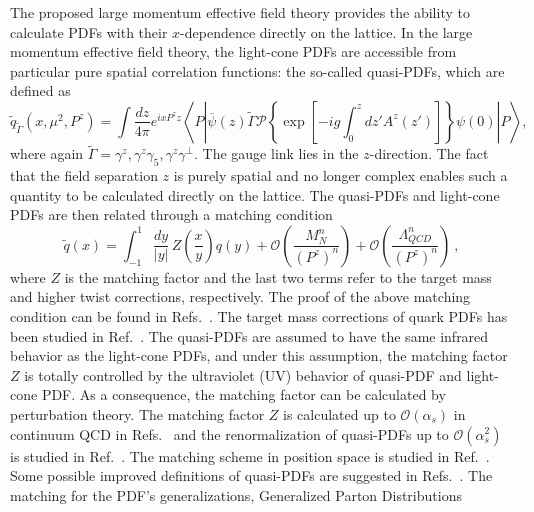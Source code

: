 \documentclass[english,preprint,aps,prd,showpacs,superscriptaddress,nofootinbib,tightenlines]{revtex4}
\begin{document}
The proposed large momentum effective field theory provides the ability
to calculate PDFs with their $x$-dependence directly on the lattice. In
the large momentum effective field theory, the light-cone PDFs are
accessible from particular pure spatial correlation functions: the
so-called quasi-PDFs, which are defined as~\cite{Ji:2013dva,Ji:2014gla}
\begin{equation}\label{eq:QSPDF_Dfntn}
\tilde{q}_{\tilde{\Gamma}}(x,\mu^{2},P^{z})=\int\frac{dz}{4\pi}e^{ixP^{z}z}\left\langle P\left|\overline{\psi}(z)\tilde{\Gamma}\mathcal{P}\left\{ \exp\left[-ig\int_{0}^{z}dz'A^{z}(z')\right]\right\} \psi(0)\right|P\right\rangle ,
\end{equation}
where again $\tilde{\Gamma}=\gamma^{z},\gamma^{z}\gamma_{5},\gamma^{z}\gamma^{\perp}$. The gauge link lies in the $z$-direction. The fact that the field separation $z$ is purely spatial and no longer complex enables such a quantity to be calculated
directly on the lattice. The quasi-PDFs and light-cone PDFs are then related
through a matching condition~\cite{Xiong:2013bka}
\begin{equation}
\tilde{q}\left(x\right)=\int_{-1}^{1}\frac{dy}{\left|y\right|}\,Z\left(\frac{x}{y}\right)q\left(y\right)+\mathcal{O}\left(\frac{M_{N}^{n}}{\left(P^{z}\right)^{n}}\right)+\mathcal{O}\left(\frac{\varLambda_{QCD}^{n}}{\left(P^{z}\right)^{n}}\right)~,
\label{eq:matchhing_condition}
\end{equation}
where $Z$ is the matching factor and the last two terms refer to the target mass and higher twist corrections, respectively. The proof of the above matching condition can be found in Refs.~\cite{Ma:2014jla,Ma:2014jga}. The target
mass corrections of quark PDFs has been studied in Ref.~\cite{Chen:2016utp}.
The quasi-PDFs are assumed to have the same infrared behavior as the
light-cone PDFs, and under this assumption, the matching factor $Z$ is totally controlled
by the ultraviolet (UV) behavior of quasi-PDF and light-cone PDF.
As a consequence, the matching factor can be calculated by perturbation
theory. The matching factor $Z$ is calculated up to $\mathcal{O}\left(\alpha_{s}\right)$
in continuum QCD in Refs.~\cite{Xiong:2013bka,Ma:2014jla} and the
renormalization of quasi-PDFs up to $\mathcal{O}\left(\alpha_{s}^{2}\right)$
is studied in Ref.~\cite{Ji:2015jwa}. The matching scheme in position
space is studied in Ref.~\cite{Ishikawa:2016znu}. Some possible improved
definitions of quasi-PDFs are suggested in Refs.~\cite{Chen:2016fxx,Li:2016amo}.
The matching for the PDF's generalizations, Generalized Parton Distributions
\end{document}
